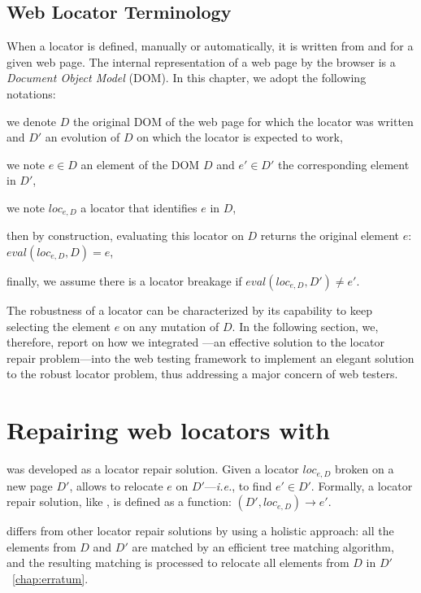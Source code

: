 \subsection{Web Locator Terminology}
When a locator is defined, manually or automatically, it is written from and for a given web page.
The internal representation of a web page by the browser is a \emph{Document Object Model} (DOM).
In this chapter, we adopt the following notations:
\begin{compactitem}
    \item we denote $D$ the original DOM of the web page for which the locator was written and $D'$ an evolution of $D$ on which the locator is expected to work,
    \item we note $e \in D$ an element of the DOM $D$ and $e'\in D'$ the corresponding element in $D'$,
    \item we note $loc_{e, D}$ a locator that identifies $e$ in $D$,
    \item then by construction, evaluating this locator on $D$ returns the original element $e$: $eval(loc_{e, D}, D) = e$,
    \item finally, we assume there is a locator breakage if $eval(loc_{e, D}, D') \neq e'$.
\end{compactitem}

The robustness of a locator can be characterized by its capability to keep selecting the element $e$ on any mutation of $D$.
In the following section, we, therefore, report on how we integrated \erratum---an effective solution to the locator repair problem---into the \cerberus web testing framework to implement an elegant solution to the robust locator problem, thus addressing a major concern of web testers.

\section{Repairing web locators with \erratum}\label{cerberus:sec:erratum}
\erratum was developed as a locator repair solution. 
Given a locator $loc_{e, D}$ broken on a new page $D'$, \erratum allows to relocate $e$ on $D'$---\emph{i.e.}, to find $e' \in D'$.
Formally, a locator repair solution, like \erratum, is defined as a function: $(D', loc_{e, D}) \to e'$.

\erratum differs from other locator repair solutions by using a holistic approach: all the elements from $D$ and $D'$ are matched by an efficient tree matching algorithm, and the resulting matching is processed to relocate all elements from $D$ in $D'$~\ref{chap:erratum}.

